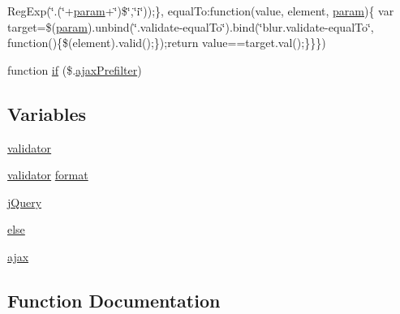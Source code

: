 \begin{DoxyCompactItemize}
Reg\+Exp(\char`\"{}.(\char`\"{}+\hyperlink{_scripts_2jquery-1_810_82_8min_8js_ae8915303d11557d1b001bc56b6195251}{param}+\char`\"{})\$\char`\"{},\char`\"{}i\char`\"{}));\}, equal\+To\+:function(value, element, \hyperlink{_scripts_2jquery-1_810_82_8min_8js_ae8915303d11557d1b001bc56b6195251}{param})\{   var target=\$(\hyperlink{_scripts_2jquery-1_810_82_8min_8js_ae8915303d11557d1b001bc56b6195251}{param}).unbind(\char`\"{}.validate-\/equal\+To\char`\"{}).bind(\char`\"{}blur.\+validate-\/equal\+To\char`\"{}, function()\{\$(element).valid();\});return value==target.\+val();\}\}\})
\item 
function \hyperlink{jquery_8validate-vsdoc_8js_a16ce734a141a1eebcad26fae286eb128}{if} (\$.\hyperlink{_scripts_2jquery-1_810_82_8js_a144939e373cc1ad511a53c4251ec7ffa}{ajax\+Prefilter})
\end{DoxyCompactItemize}
\subsection*{Variables}
\begin{DoxyCompactItemize}
\item 
\hyperlink{jquery_8validate-vsdoc_8js_a2dc8272bb221cdffcccbd20db038f172}{validator}
\item 
\hyperlink{_scripts_2jquery_8validate_8js_a2dc8272bb221cdffcccbd20db038f172}{validator} \hyperlink{jquery_8validate-vsdoc_8js_a387137c43ed9616d39ba90e890d181eb}{format}
\item 
\hyperlink{jquery_8validate-vsdoc_8js_a2b1d6f9c448e3ce72f4e1865d6e38d2c}{j\+Query}
\item 
\hyperlink{jquery_8validate-vsdoc_8js_a0544c3fe466e421738dae463968b70ba}{else}
\item 
\hyperlink{jquery_8validate-vsdoc_8js_a77004c0fdc08a5bc07afa0b099cdf6df}{ajax}
\end{DoxyCompactItemize}


\subsection{Function Documentation}
